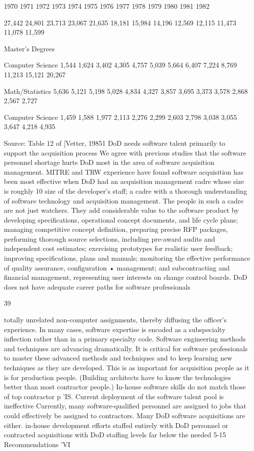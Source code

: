 \documentclass[12pt]{article}
\begin{document}
1970
1971
1972
1973
1974
1975
1976
1977
1978
1979
1980
1981
1982

27,442
24,801
23,713
23,067
21,635
18,181
15,984
14,196
12,569
12,115
11,473
11,078
11,599

Master's Degrees

Computer Science
1,544
1,624
3,402
4,305
4,757
5,039
5,664
6,407
7,224
8,769
11,213
15,121
20,267

Math/Statistics
5,636
5,121
5,198
5,028
4,834
4,327
3,857
3,695
3,373
3,578
2,868
2,567
2,727

Computer Science
1,459
1,588
1,977
2,113
2,276
2,299
2,603
2,798
3,038
3,055
3,647
4,218
4,935

Source: Table 12 of [Vetter, 19851
DoD needs software talent primarily to support the acquisition process
We agree with previous studies that the software personnel shortage hurts DoD most
in the area of software acquisition management.
MITRE and TRW experience have found software acquisition has been most effective
when DoD had an acquisition management cadre whose size is roughly 10%
size of the developer's staff; a cadre with a thorough understanding of software technology
and acquisition management.
The people in such a cadre are not just watchers. They add considerable value to
the software product by developing specifications, operational concept documents, and life
cycle plans; managing competitive concept definition, preparing precise RFP packages,
performing thorough source selections, including pre-award audits and independent cost
estimates; exercising prototypes for realistic user feedback; improving specifications, plans
and manuals; monitoring the effective performance of quality assurance, configuration
• management; and subcontracting and financial management, representing user interests
on change control boards.
DoD does not have adequate career paths for software professionals

39

totally unrelated non-computer assignments, thereby diffusing the officer's experience. In
many cases, software expertise is encoded as a subspecialty inflection rather than in a
primary specialty code.
Software engineering methods and techniques are advancing dramatically. It is critical
for software professionals to master these advanced methods and techniques and to keep
learning new techniques as they are developed. This is as important for acquisition people
as it is for production people. (Building architects have to know the technologies better
than most contractor people.) In-house software skills do not match those of top contractor
p 'IS.
Current deployment of the software talent pool is ineffective
Currently, many software-qualified personnel are assigned to jobs that could effectively be assigned to contractors. Many DoD software acquisitions are either. in-house
development efforts staffed entirely with DoD personnel or contracted acquisitions with
DoD staffing levels far below the needed 5-15%
Recommendations
'VI
\end{document}
